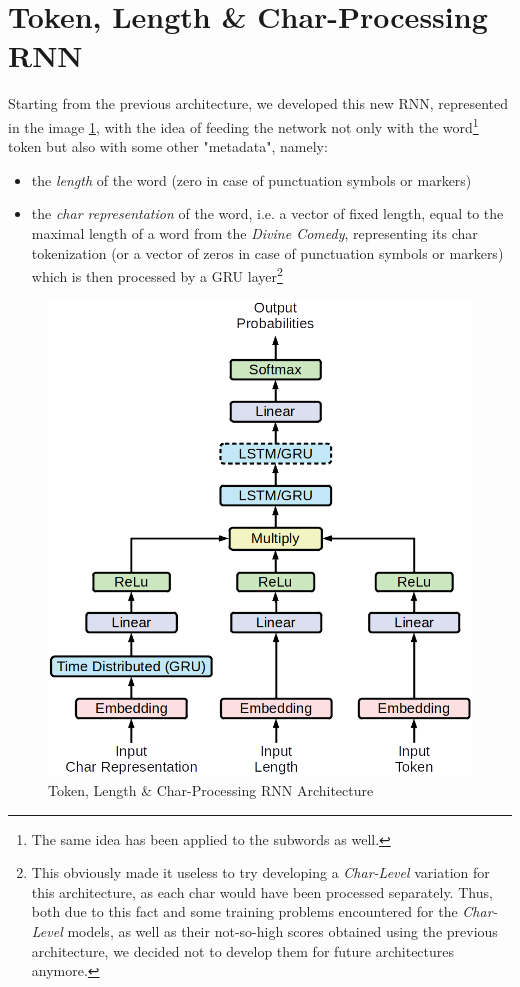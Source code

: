 \section{Token, Length \& Char-Processing RNN}

Starting from the previous architecture, we developed this new \textsc{RNN}, represented in the image \ref{complex-rnn}, with the idea of feeding the network not only with the word\footnote{
    The same idea has been applied to the subwords as well.
} token but also with some other "metadata", namely:
\begin{itemize}
    \item the \textit{length} of the word (zero in case of punctuation symbols or markers)
    \item the \textit{char representation} of the word, i.e. a vector of fixed length, equal to the maximal length of a word from the \textit{Divine Comedy}, representing its char tokenization (or a vector of zeros in case of punctuation symbols or markers) which is then processed by a \textsc{GRU} layer\footnote{
        This obviously made it useless to try developing a \textit{Char-Level} variation for this architecture, as each char would have been processed separately. Thus, both due to this fact and some training problems encountered for the \textit{Char-Level} models, as well as their not-so-high scores obtained using the previous architecture, we decided not to develop them for future architectures anymore. 
    }
\end{itemize}

\begin{figure}[!hbt]
    \centering
    \includegraphics[scale=0.65]{images/model-2.png}%
    \caption{Token, Length \& Char-Processing RNN Architecture}%
    \label{complex-rnn}
\end{figure}


